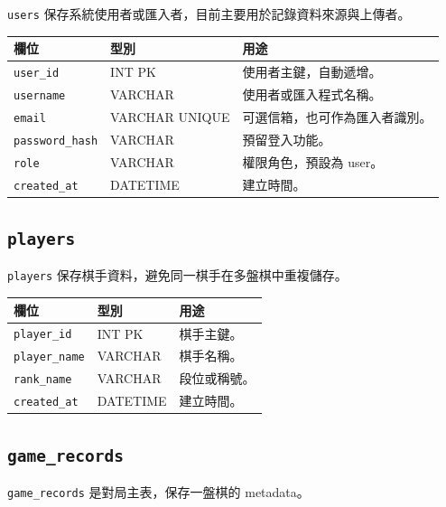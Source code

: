 \documentclass[12pt,a4paper,fontset=none]{ctexart}
\begin{document}
\texttt{users} 保存系統使用者或匯入者，目前主要用於記錄資料來源與上傳者。

\begin{longtable}{p{}p{}p{}}
\toprule
\textbf{欄位} & \textbf{型別} & \textbf{用途}\\
\midrule
\endhead
\texttt{user\_id} & INT PK & 使用者主鍵，自動遞增。\\
\texttt{username} & VARCHAR & 使用者或匯入程式名稱。\\
\texttt{email} & VARCHAR UNIQUE & 可選信箱，也可作為匯入者識別。\\
\texttt{password\_hash} & VARCHAR & 預留登入功能。\\
\texttt{role} & VARCHAR & 權限角色，預設為 user。\\
\texttt{created\_at} & DATETIME & 建立時間。\\
\bottomrule
\end{longtable}

\subsection{\texttt{players}}

\texttt{players} 保存棋手資料，避免同一棋手在多盤棋中重複儲存。

\begin{longtable}{p{}p{}p{}}
\toprule
\textbf{欄位} & \textbf{型別} & \textbf{用途}\\
\midrule
\endhead
\texttt{player\_id} & INT PK & 棋手主鍵。\\
\texttt{player\_name} & VARCHAR & 棋手名稱。\\
\texttt{rank\_name} & VARCHAR & 段位或稱號。\\
\texttt{created\_at} & DATETIME & 建立時間。\\
\bottomrule
\end{longtable}

\subsection{\texttt{game\_records}}

\texttt{game\_records} 是對局主表，保存一盤棋的 metadata。
\end{document}
